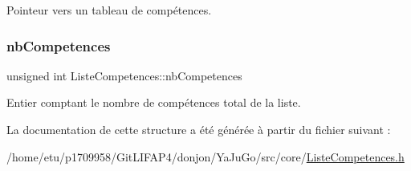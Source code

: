 Pointeur vers un tableau de compétences. \mbox{\label{structListeCompetences_ae477d9111fd3f822c8da9c67c32dfc51}} 
\subsubsection{\texorpdfstring{nb\+Competences}{nbCompetences}}
{\footnotesize\ttfamily unsigned int Liste\+Competences\+::nb\+Competences}

Entier comptant le nombre de compétences total de la liste. 

La documentation de cette structure a été générée à partir du fichier suivant \+:\begin{DoxyCompactItemize}
\item 
/home/etu/p1709958/\+Git\+L\+I\+F\+A\+P4/donjon/\+Ya\+Ju\+Go/src/core/\mbox{\hyperlink{ListeCompetences_8h}{Liste\+Competences.\+h}}\end{DoxyCompactItemize}
